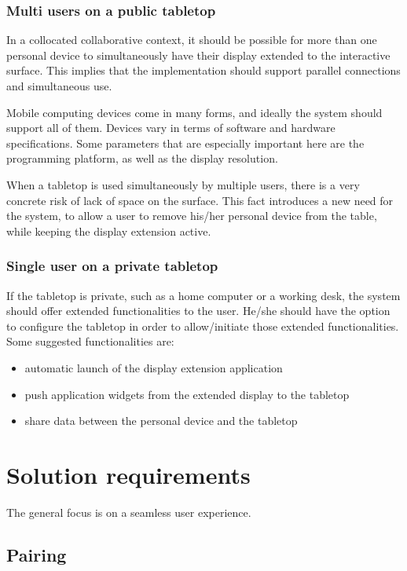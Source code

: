 \subsubsection{Multi users on a public tabletop}

In a collocated collaborative context, it should be possible for more than one personal device to simultaneously have their display extended to the interactive surface.
This implies that the implementation should support parallel connections and simultaneous use.

Mobile computing devices come in many forms, and ideally the system should support all of them.
Devices vary in terms of software and hardware specifications.
Some parameters that are especially important here are the programming platform, as well as the display resolution.

When a tabletop is used simultaneously by multiple users, there is a very concrete risk of lack of space on the surface.
This fact introduces a new need for the system, to allow a user to remove his/her personal device from the table, while keeping the display extension active.

\subsubsection{Single user on a private tabletop}

If the tabletop is private, such as a home computer or a working desk, the system should offer extended functionalities to the user.
He/she should have the option to configure the tabletop in order to allow/initiate those extended functionalities.
Some suggested functionalities are:
\begin{itemize}
\item automatic launch of the display extension application
\item push application widgets from the extended display to the tabletop
\item share data between the personal device and the tabletop
\end{itemize}

\section{Solution requirements}

The general focus is on a seamless user experience.

\subsection{Pairing}

